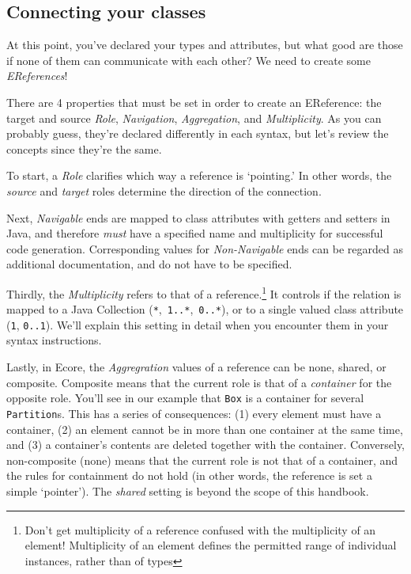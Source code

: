 \newpage
\subsection{Connecting your classes}
\genHeader
\hypertarget{static:references splash}{}

\texttt{}
\emph{}

At this point, you've declared your types and attributes, but what good are those if none of them can communicate with each other? We need to create some
\emph{EReferences}!

There are 4 properties that must be set in order to create an EReference: the target and source \emph{Role}, \emph{Navigation}, \emph{Aggregation}, and
\emph{Multiplicity}. As you can probably guess, they're declared differently in each syntax, but let's review the concepts since they're the same.

To start, a \emph{Role} clarifies which way a reference is `pointing.' In other words, the \emph{source} and \emph{target} roles determine the direction of the
connection.

Next, \emph{Navigable} ends are mapped to class attributes with getters and setters in Java, and therefore \emph{must} have a specified name and
multiplicity for successful code generation. Corresponding values for \emph{Non-Navigable} ends can  be regarded as additional documentation, and do not have
to be specified.

Thirdly, the \emph{Multiplicity} refers to that of a reference.\footnote{Don't get multiplicity of a reference confused with the multiplicity of an element!
Multiplicity of an element defines the permitted range of individual instances, rather than of types} It controls if the relation is mapped to a
Java Collection (\texttt{*},~\texttt{1..*},~\texttt{0..*}), or to a single valued class attribute (\texttt{1}, \texttt{0..1}). We'll explain this setting in
detail when you encounter them in your syntax instructions.

Lastly, in Ecore, the \emph{Aggregration} values of a reference can be none, shared, or com\-po\-site. Composite means that the current role is that of a
\emph{container} for the opposite role. You'll see in our example that \texttt{Box} is a container for several \texttt{Partition}s.
This has a series of consequences: (1) every element must have a container, (2) an element cannot be in more than one container at the same time, and (3) a
container's contents are deleted together with the container. Conversely, non-composite (none) means that the current role is not that of a container,
and the rules for containment do not hold (in other words, the reference is set a simple `pointer'). The \emph{shared} setting is beyond the scope of this
handbook.





